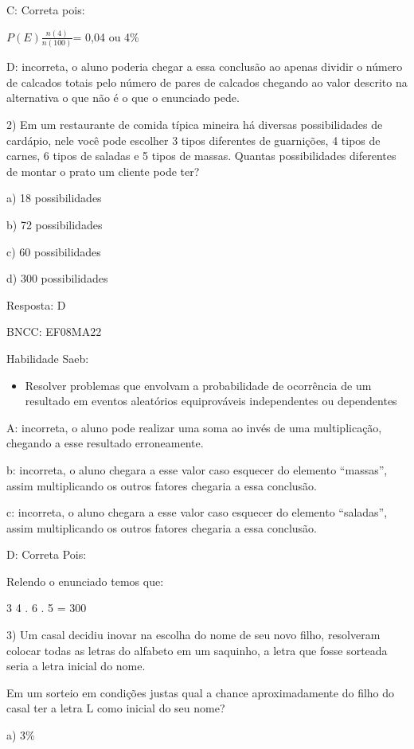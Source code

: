 {C: Correta pois:

\(P(E)\frac{n(4)}{n(100)}\)= 0,04 ou 4\%

D: incorreta, o aluno poderia chegar a essa conclusão ao apenas dividir
o número de calcados totais pelo número de pares de calcados chegando ao
valor descrito na alternativa o que não é o que o enunciado pede.

2) Em um restaurante de comida típica mineira há diversas possibilidades
de cardápio, nele você pode escolher 3 tipos diferentes de guarnições, 4
tipos de carnes, 6 tipos de saladas e 5 tipos de massas. Quantas
possibilidades diferentes de montar o prato um cliente pode ter?

a) 18 possibilidades

b) 72 possibilidades

c) 60 possibilidades

d) 300 possibilidades

Resposta: D

BNCC: EF08MA22

Habilidade Saeb:

\begin{itemize}
\tightlist
\item
  Resolver problemas que envolvam a probabilidade de ocorrência de um
  resultado em eventos aleatórios equiprováveis independentes ou
  dependentes
\end{itemize}

A: incorreta, o aluno pode realizar uma soma ao invés de uma
multiplicação, chegando a esse resultado erroneamente.

b: incorreta, o aluno chegara a esse valor caso esquecer do elemento
``massas'', assim multiplicando os outros fatores chegaria a essa
conclusão.

c: incorreta, o aluno chegara a esse valor caso esquecer do elemento
``saladas'', assim multiplicando os outros fatores chegaria a essa
conclusão.

D: Correta Pois:

Relendo o enunciado temos que:

\num{3} 4 . 6 . 5 = 300

3) Um casal decidiu inovar na escolha do nome de seu novo filho,
resolveram colocar todas as letras do alfabeto em um saquinho, a letra
que fosse sorteada seria a letra inicial do nome.

Em um sorteio em condições justas qual a chance aproximadamente do filho
do casal ter a letra L como inicial do seu nome?

a) 3\%

}
